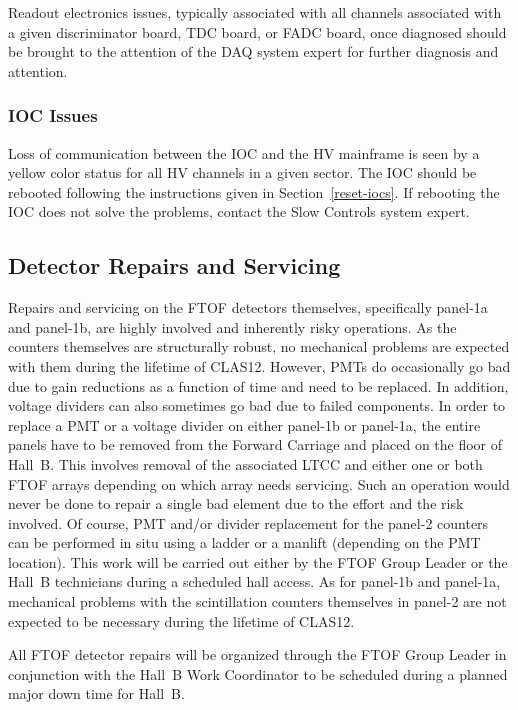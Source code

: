 \documentclass[12pt]{article}
\begin{document}
Readout electronics issues, typically associated with all channels associated with a given
discriminator board, TDC board, or FADC board, once diagnosed should be brought to the
attention of the DAQ system expert for further diagnosis and attention.

\subsubsection{IOC Issues}
\label{ioc-issues}

Loss of communication between the IOC and the HV mainframe is seen by a yellow color status for
all HV channels in a given sector. The IOC should be rebooted following the instructions given 
in Section~\ref{reset-iocs}. If rebooting the IOC does not solve the problems, contact the 
Slow Controls system expert.

\subsection{Detector Repairs and Servicing}

Repairs and servicing on the FTOF detectors themselves, specifically panel-1a and panel-1b, are 
highly involved and inherently risky operations. As the counters themselves are structurally robust, 
no mechanical problems are expected with them during the lifetime of CLAS12. However, PMTs do 
occasionally go bad due to gain reductions as a function of time and need to be replaced. In addition, 
voltage dividers can also sometimes go bad due to failed components. In order to replace a PMT or a 
voltage divider on either panel-1b or panel-1a, the entire panels have to be removed from the Forward 
Carriage and placed on the floor of Hall~B. This involves removal of the associated LTCC and either 
one or both FTOF arrays depending on which array needs servicing. Such an operation would never be 
done to repair a single bad element due to the effort and the risk involved. Of course, PMT and/or 
divider replacement for the panel-2 counters can be performed in situ using a ladder or a manlift 
(depending on the PMT location). This work will be carried out either by the FTOF Group Leader or 
the Hall~B technicians during a scheduled hall access. As for panel-1b and panel-1a, mechanical 
problems with the scintillation counters themselves in panel-2 are not expected to be necessary 
during the lifetime of CLAS12.

All FTOF detector repairs will be organized through the FTOF Group Leader in conjunction with the
Hall~B Work Coordinator to be scheduled during a planned major down time for Hall~B.
\end{document}
